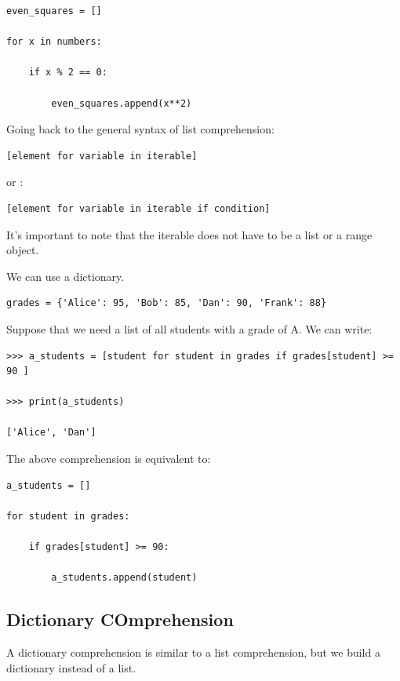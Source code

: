 \documentclass{article}
\begin{document}
\begin{lstlisting}
even_squares = []

for x in numbers:

    if x % 2 == 0:

        even_squares.append(x**2)
\end{lstlisting}

Going back to the general syntax of list comprehension:

\begin{lstlisting}
[element for variable in iterable]
\end{lstlisting}

or :

\begin{lstlisting}
[element for variable in iterable if condition]
\end{lstlisting}

It's important to note that the iterable does not have to be a list or a range object.

We can use a dictionary.

\begin{lstlisting}
grades = {'Alice': 95, 'Bob': 85, 'Dan': 90, 'Frank': 88}
\end{lstlisting}

Suppose that we need a list of all students with a grade of A.  We can write:

\begin{lstlisting}
>>> a_students = [student for student in grades if grades[student] >= 90 ] 

>>> print(a_students)

['Alice', 'Dan']
\end{lstlisting}

The above comprehension is equivalent to:

\begin{lstlisting}
a_students = []

for student in grades:

    if grades[student] >= 90:

        a_students.append(student)
\end{lstlisting}

\subsection{Dictionary COmprehension}
A dictionary comprehension is similar to a list comprehension, but we build a dictionary instead of a list. 
\end{document}
